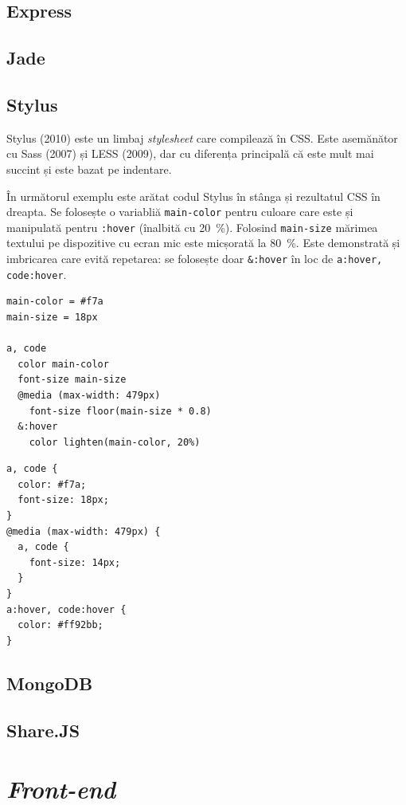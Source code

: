 \documentclass[a4wide,12pt]{report}
\newcommand{\eng}[1]{\emph{#1}} %
\newcommand{\cod}[1]{\texttt{#1}}
\begin{document}
\subsection{Express}

\subsection{Jade}

\subsection{Stylus}

Stylus (2010) este un limbaj \eng{stylesheet} care compilează în CSS. Este
asemănător cu Sass (2007) și LESS (2009), dar cu diferența principală că este
mult mai succint și este bazat pe indentare.

În următorul exemplu este arătat codul Stylus în stânga și rezultatul CSS în
dreapta. Se folosește o variabliă \cod{main-color} pentru culoare care este și
manipulată pentru \cod{:hover} (înalbită cu 20~\%). Folosind \cod{main-size}
mărimea textului pe dispozitive cu ecran mic este micșorată la 80~\%. Este
demonstrată și imbricarea care evită repetarea: se folosește doar \cod{\&:hover}
în loc de \cod{a:hover, code:hover}.

\minipage{9cm}
\begin{verbatim}
main-color = #f7a
main-size = 18px

a, code
  color main-color
  font-size main-size
  @media (max-width: 479px)
    font-size floor(main-size * 0.8)
  &:hover
    color lighten(main-color, 20%)
\end{verbatim}
\endminipage
\minipage{4cm}
\begin{verbatim}
a, code {
  color: #f7a;
  font-size: 18px;
}
@media (max-width: 479px) {
  a, code {
    font-size: 14px;
  }
}
a:hover, code:hover {
  color: #ff92bb;
}
\end{verbatim}
\endminipage

\subsection{MongoDB}

\subsection{Share.JS}

\section{\eng{Front-end}}
\end{document}
